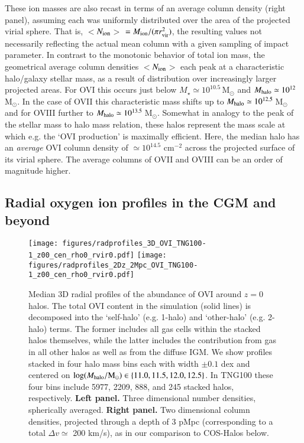 \documentclass[useAMS,usenatbib]{mnras}
\newcommand{\msun}{\,M$_{\odot}$\xspace}
\newcommand{\ovi}{OVI\xspace}
\newcommand{\ovii}{OVII\xspace}
\newcommand{\oviii}{OVIII\xspace}
\begin{document}
These ion masses are also recast in terms of an average column density (right panel), assuming each was uniformly distributed over the area of the projected virial sphere. That is, $<$$N_{\rm ion}$$>$ $= M_{\rm ion} / (\pi r_{\rm vir}^2)$, the resulting values not necessarily reflecting the actual mean column with a given sampling of impact parameter. In contrast to the monotonic behavior of total ion mass, the geometrical average column densities $<$$N_{\rm ion}$$>$ each peak at a characteristic halo/galaxy stellar mass, as a result of distribution over increasingly larger projected areas. For \ovi this occurs just below $M_\star \simeq 10^{10.5}$\msun and $M_{\rm halo} \simeq 10^{12}$\msun. In the case of \ovii this characteristic mass shifts up to $M_{\rm halo} \simeq 10^{12.5}$\msun and for \oviii further to $M_{\rm halo} \simeq 10^{13.5}$\msun. Somewhat in analogy to the peak of the stellar mass to halo mass relation, these halos represent the mass scale at which e.g. the `\ovi production' is maximally efficient. Here, the median halo has an \textit{average} \ovi column density of $\simeq 10^{14.5}$ cm$^{-2}$ across the projected surface of its virial sphere. The average columns of \ovii and \oviii can be an order of magnitude higher.

\subsection{Radial oxygen ion profiles in the CGM and beyond}

\begin{figure*}
\centering
\texttt{[image: figures/radprofiles\_3D\_OVI\_TNG100-1\_z00\_cen\_rho0\_rvir0.pdf]}
\texttt{[image: figures/radprofiles\_2Dz\_2Mpc\_OVI\_TNG100-1\_z00\_cen\_rho0\_rvir0.pdf]}
\caption{ Median 3D radial profiles of the abundance of \ovi around $z=0$ halos. The total \ovi content in the simulation (solid lines) is decomposed into the `self-halo' (e.g. 1-halo) and `other-halo' (e.g. 2-halo) terms. The former includes all gas cells within the stacked halos themselves, while the latter includes the contribution from gas in all other halos as well as from the diffuse IGM. We show profiles stacked in four halo mass bins each with width $\pm 0.1$ dex and centered on $\log(M_{\rm halo}/\rm{M}_\odot) \in \{11.0,11.5,12.0,12.5\}$. In TNG100 these four bins include 5977, 2209, 888, and 245 stacked halos, respectively.
\textbf{Left panel.} Three dimensional number densities, spherically averaged.
\textbf{Right panel.} Two dimensional column densities, projected through a depth of 3 pMpc (corresponding to a total $\Delta v \simeq$ 200 km/s), as in our comparison to COS-Halos below.
 \label{fig_radprofiles}}
\end{figure*}
\end{document}
